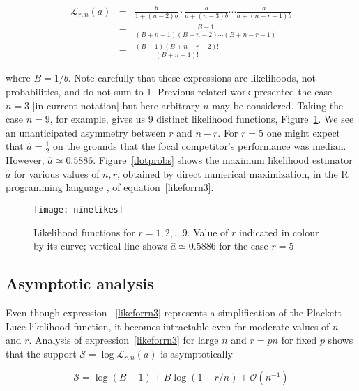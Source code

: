 \documentclass[article]{ajs}
\begin{document}
\begin{eqnarray}\label{likeforrn1}
  \mathcal{L}_{r,n}(a) &=&
\frac{b}{1+ (n-2)b}\cdot
\frac{b}{a+(n-3)b}\cdots\frac{a}{a+(n-r-1)b}\nonumber\\
&=& \frac{B-1}{(B+n-1)(B+n-2)\cdots(B+n-r-1)}\nonumber\\ 
&=& \frac{(B-1)(B+n-r-2)!}{(B+n-1)!}\label{likeforrn3}
\end{eqnarray}

\noindent where $B=1/b$.  Note carefully that these expressions are
likelihoods, not probabilities, and do not sum to 1.  Previous related
work \citep{hankin2024_hyper3} presented the case $n=3$ [in current
  notation] but here arbitrary $n$ may be considered.  Taking the case
$n=9$, for example, gives us 9 distinct likelihood functions,
Figure~\ref{ninelikes}.  We see an unanticipated asymmetry between $r$
and $n-r$.  For $r=5$ one might expect that $\hat{a}=\frac{1}{2}$ on
the grounds that the focal competitor's performance was median.
However, $\hat{a}\simeq 0.5886$.  Figure~\ref{dotprobs} shows the
maximum likelihood estimator $\hat{a}$ for various values of $n,r$,
obtained by direct numerical maximization, in the R programming
language \cite{rcore2024}, of equation~\ref{likeforrn3}.

\begin{figure}[t]
  \begin{centering}
\texttt{[image: ninelikes]}  %
\caption{Likelihood functions for $r=1,2,\ldots 9$\label{ninelikes}.  Value
  of $r$ indicated in colour by its curve; vertical line shows
  $\hat{a}\simeq 0.5886$ for the case $r=5$}
\end{centering}
\end{figure}


\subsection{Asymptotic analysis}

Even though expression ~\ref{likeforrn3} represents a simplification
of the Plackett-Luce likelihood function, it becomes intractable even
for moderate values of $n$ and $r$.  Analysis of
expression~\ref{likeforrn3} for large $n$ and $r=pn$ for fixed $p$
shows that the support $\mathcal{S}=\log\mathcal{L}_{r,n}(a)$ is
asymptotically

\begin{equation}\label{asymptotic}
\mathcal{S}=
\log(B-1) + B\log(1-r/n)
+\mathcal{O}\left(n^{-1}\right)
\end{equation}
\end{document}
